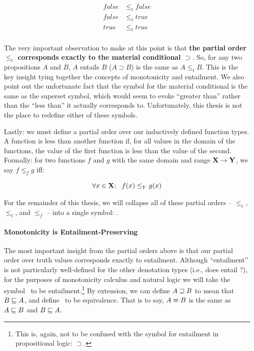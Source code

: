 \begin{align*}
  false &\leq_t false \\
  false &\leq_t true \\
  true &\leq_t true \\
\end{align*}

The very important observation to make at this point is that
  \textbf{the partial order $\leq_t$ corresponds exactly to the material conditional $\supset$}.
So, for any two propositions $A$ and $B$, $A$ entails $B$ ($A \supset B$) is the same
  as $A \leq_t B$.
This is the key insight tying together the concepts of monotonicity and entailment.
We also point out the unfortunate fact that the symbol for the material conditional
  is the same as the superset symbol, which would seem to evoke ``greater than'' rather
  than the ``less than'' it actually corresponds to.
Unfortunately, this thesis is not the place to redefine either of these symbols.

Lastly: we must define a partial order over our inductively defined function types.
A function is less than another function if, for all
  values in the domain of the functions, the value of the first function is less than
  the value of the second.
Formally: for two functions $f$ and $g$ with the same domain and range $\mathbf{X} \rightarrow \mathbf{Y}$,
  we say $f \leq_f g$ iff:

\begin{equation}
  \forall x \in \mathbf{X}; ~~ f(x) \leq_Y g(x)
\end{equation}

For the remainder of this thesis, we will collapse all of these partial orders
  -- $\leq_e$, $\leq_t$, and $\leq_f$ -- into
  a single symbol: \forward.



\paragraph{Monotonicity is Entailment-Preserving}
The most important insight from the partial orders above is that our partial order
  over truth values corresponds exactly to entailment.
Although ``entailment'' is not particularly well-defined for the other denotation
  types (i.e., does  entail ?), for the purposes of monotonicity
  calculus and natural logic we will take the symbol \forward\ to be entailment.\footnote{
    This is, again, not to be confused with the symbol for entailment in propositional
    logic: $\supset$.
  }
By extension, we can define $A \sqsupseteq B$ to mean that $B \sqsubseteq A$, and define
  \equivalent\ to be equivalence.
That is to say, $A \equiv B$ is the same as $A \sqsubseteq B$ and $B \sqsubseteq A$.

